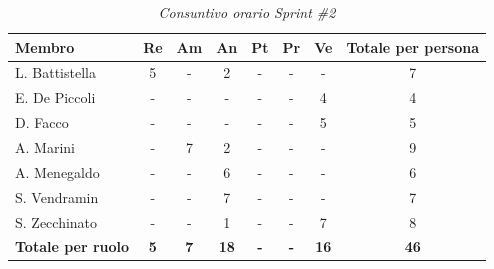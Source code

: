 \documentclass[a4paper, 10pt, colorlinks=true, linkcolor=black, urlcolor=blue, citecolor=blue, hidelinks]{article}
\renewcommand{\arraystretch}{1.2}
\begin{document}
\begin{table}[H]
    \centering
    \renewcommand{\arraystretch}{1.4}
    \begin{tabular}{|l|c|c|c|c|c|c|c|}
        \hline
        \rowcolor{bluBitless!15}
        \textbf{Membro} & \textbf{Re} & \textbf{Am} & \textbf{An} & \textbf{Pt} & \textbf{Pr} & \textbf{Ve} & \textbf{Totale per persona} \\
        \hline
        L. Battistella & 5 & - & 2 & - & - & - & 7 \\ \hline
        E. De Piccoli & - & - & - & - & - & 4 & 4 \\ \hline
        D. Facco & - & - & - & - & - & 5 & 5 \\ \hline
        A. Marini & - & 7 & 2 & - & - & - & 9 \\ \hline
        A. Menegaldo & - & - & 6 & - & - & - & 6 \\ \hline
        S. Vendramin & - & - & 7 & - & - & - & 7 \\ \hline
        S. Zecchinato & - & - & 1 & - & - & 7 & 8 \\ \hline
        \rowcolor{bluBitless!8}
        \textbf{Totale per ruolo} & \textbf{5} & \textbf{7} & \textbf{18} & \textbf{-} & \textbf{-} & \textbf{16} & \textbf{46} \\
        \hline
    \end{tabular}
    \caption{\textit{Consuntivo orario Sprint \#2}}
\end{table}
\end{document}
